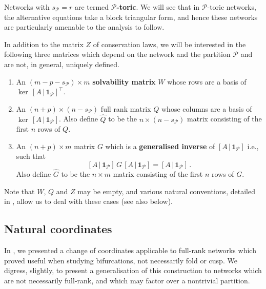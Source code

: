 \documentclass[11pt]{amsart}
\newcommand{\wQ}{\widehat{Q}}
\newcommand{\wG}{\widehat{G}}
\newcommand{\mP}{\mathcal{P}}
\theoremstyle{definition}
\begin{document}
Networks with $s_{\mP} = r$ are termed {\bf $\mP$-toric}. We will see that in $\mP$-toric networks, the alternative equations take a block triangular form, and hence these networks are particularly amenable to the analysis to follow. 

In addition to the matrix $Z$ of conservation laws, we will be interested in the following three matrices which depend on the network and the partition $\mP$ and are not, in general, uniquely defined. 
\begin{enumerate}
\item An $(m-p-s_{\mP})\times m$ {\bf solvability matrix} $W$ whose rows are a basis of $\ker\,[A\,|\,\bm{1}_\mP]^\top$.

\smallskip
\item An $(n+p) \times (n-s_{\mP})$ full rank matrix $Q$ whose columns are a basis of $\ker\,[A\,|\,\bm{1}_\mP]$. Also define $\wQ$ to be the $n \times (n-s_{\mP})$ matrix consisting of the first $n$ rows of $Q$.

\smallskip
\item An $(n+p) \times m$ matrix $G$ which is a \textbf{generalised inverse} of $[A\,|\,\bm{1}_\mP]$ i.e., such that 
\[ [A\,|\,\bm{1}_\mP]\,G\,[A\,|\,\bm{1}_\mP] = [A\,|\,\bm{1}_\mP]\, . \] 
Also define $\wG$ to be the $n \times m$ matrix consisting of the first $n$ rows of $G$. 

\end{enumerate}
Note that $W$, $Q$ and $Z$ may be empty, and various natural conventions, detailed in \cite{banajifeliu26}, allow us to deal with these cases (see also  below).

\subsection{Natural coordinates}
\label{secnatural}

In \cite[Section 2.5]{BBH2024smallbif}, we presented a change of coordinates applicable to full-rank networks which proved useful when studying bifurcations, not necessarily fold or cusp. We digress, slightly, to present a generalisation of this construction to networks which are not necessarily full-rank, and which may factor over a nontrivial partition. 
\end{document}
